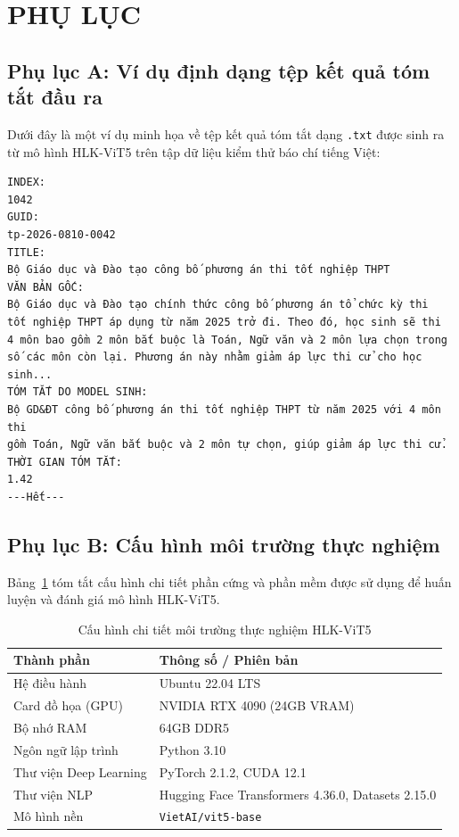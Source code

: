 \chapter*{PHỤ LỤC}

\section*{Phụ lục A: Ví dụ định dạng tệp kết quả tóm tắt đầu ra}

Dưới đây là một ví dụ minh họa về tệp kết quả tóm tắt dạng \texttt{.txt} được sinh ra từ mô hình HLK-ViT5 trên tập dữ liệu kiểm thử báo chí tiếng Việt:

\begin{tcolorbox}[colback=gray!5!white,colframe=gray!75!black,title=Ví dụ định dạng đầu ra của tệp kết quả (.txt)]
\small
\begin{verbatim}
INDEX:
1042
GUID:
tp-2026-0810-0042
TITLE:
Bộ Giáo dục và Đào tạo công bố phương án thi tốt nghiệp THPT
VĂN BẢN GỐC:
Bộ Giáo dục và Đào tạo chính thức công bố phương án tổ chức kỳ thi 
tốt nghiệp THPT áp dụng từ năm 2025 trở đi. Theo đó, học sinh sẽ thi 
4 môn bao gồm 2 môn bắt buộc là Toán, Ngữ văn và 2 môn lựa chọn trong 
số các môn còn lại. Phương án này nhằm giảm áp lực thi cử cho học sinh...
TÓM TẮT DO MODEL SINH:
Bộ GD&ĐT công bố phương án thi tốt nghiệp THPT từ năm 2025 với 4 môn thi 
gồm Toán, Ngữ văn bắt buộc và 2 môn tự chọn, giúp giảm áp lực thi cử.
THỜI GIAN TÓM TẮT:
1.42
---Hết---
\end{verbatim}
\end{tcolorbox}

\section*{Phụ lục B: Cấu hình môi trường thực nghiệm}

Bảng~\ref{tab:env_appendix} tóm tắt cấu hình chi tiết phần cứng và phần mềm được sử dụng để huấn luyện và đánh giá mô hình HLK-ViT5.

\begin{table}[h]
\centering
\renewcommand{\arraystretch}{1.3}
\begin{tabularx}{\textwidth}{l X}
\hline
\textbf{Thành phần} & \textbf{Thông số / Phiên bản} \\ \hline
Hệ điều hành & Ubuntu 22.04 LTS \\
Card đồ họa (GPU) & NVIDIA RTX 4090 (24GB VRAM) \\
Bộ nhớ RAM & 64GB DDR5 \\
Ngôn ngữ lập trình & Python 3.10 \\
Thư viện Deep Learning & PyTorch 2.1.2, CUDA 12.1 \\
Thư viện NLP & Hugging Face Transformers 4.36.0, Datasets 2.15.0 \\
Mô hình nền & \texttt{VietAI/vit5-base} \\ \hline
\end{tabularx}
\caption{Cấu hình chi tiết môi trường thực nghiệm HLK-ViT5}
\label{tab:env_appendix}
\end{table}
